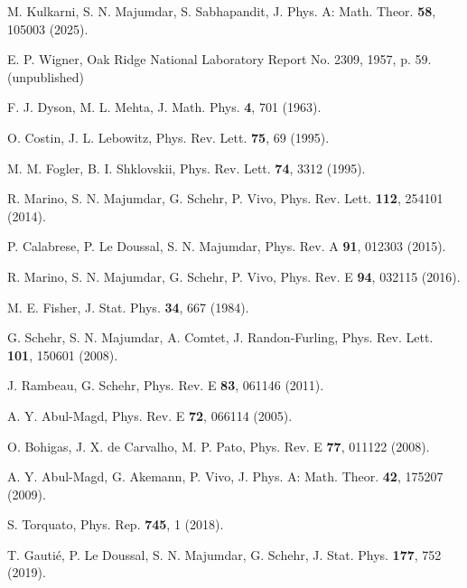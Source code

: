 \documentclass[onecolumn,superscriptaddress,
 amsmath,amssymb,
 aps,
 prd,
]{revtex4-1}
\begin{document}
\begin{thebibliography}{1}
 M. Kulkarni, S. N. Majumdar, S. Sabhapandit, J. Phys. A: Math. Theor. {\bf 58}, 105003 (2025).

E. P. Wigner, Oak Ridge National Laboratory Report No. 2309, 1957, p. 59. (unpublished)

F. J. Dyson, M. L. Mehta, J. Math. Phys. {\bf 4}, 701 (1963).

O. Costin, J. L. Lebowitz, Phys. Rev. Lett. {\bf 75}, 69 (1995).

M. M. Fogler, B. I. Shklovskii, Phys. Rev. Lett. {\bf 74}, 3312 (1995).

 R. Marino, S. N. Majumdar, G. Schehr, P. Vivo, Phys. Rev. Lett. {\bf 112}, 254101 (2014).


P. Calabrese, P. Le Doussal, S. N. Majumdar, Phys. Rev. A {\bf 91}, 012303 (2015).


R. Marino, S. N. Majumdar, G. Schehr, P. Vivo, Phys. Rev. E {\bf 94}, 032115 (2016).


M. E. Fisher, J. Stat. Phys. {\bf 34}, 667 (1984).


G. Schehr, S. N. Majumdar, A. Comtet, J. Randon-Furling, Phys. Rev. Lett. {\bf 101}, 150601 (2008).

 J. Rambeau, G. Schehr, Phys. Rev. E {\bf 83}, 061146 (2011).



 A. Y. Abul-Magd, Phys. Rev. E {\bf 72}, 066114 (2005).


 O. Bohigas, J. X. de Carvalho, M. P. Pato, Phys. Rev. E {\bf 77}, 011122 (2008).

 A. Y. Abul-Magd, G. Akemann, P. Vivo, J. Phys. A: Math. Theor. {\bf 42}, 175207 (2009).

S. Torquato, Phys. Rep. {\bf 745}, 1 (2018).


T. Gauti{\'e}, P. Le Doussal, S. N. Majumdar, G. Schehr, J. Stat. Phys. {\bf 177}, 752 (2019).


\end{thebibliography}
\end{document}

